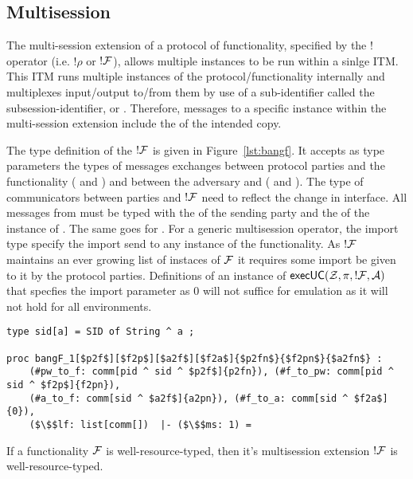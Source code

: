 \subsection{Multisession}
The multi-session extension of a protocol of functionality, specified by the $!$ operator (i.e. $!\rho$ or $!\mathcal{F}$), allows multiple instances to be run within a sinlge ITM.
This ITM runs multiple instances of the protocol/functionality internally and multiplexes input/output to/from them by use of a sub-identifier called the subsession-identifier, or .
Therefore, messages to a specific instance within the multi-session extension include the  of the intended copy. 

The type definition of the $!\mathcal{F}$ is given in Figure~\ref{lst:bangf}. 
It accepts as type parameters the types of messages exchanges between protocol parties and the functionality ( and ) and between the adversary and \F ( and ). 
The type of communicators between parties and $!\mathcal{F}$ need to reflect the change in interface. 
All messages from  must be typed with the  of the sending party and the  of the instance of \F. 
The same goes for \F. 
For a generic multisession operator, the import type specify the import send to any instance of the functionality.
As $!\mathcal{F}$ maintains an ever growing list of instaces of $\mathcal{F}$ it requires some import be given to it by the protocol parties. 
Definitions of an instance of ${\mathsf {execUC}}(\mathcal{Z}, \pi, !\mathcal{F}, \mathcal{A})$ that specfies the import parameter  as 0 will not suffice for emulation as it will not hold for all environments. 

\begin{figure*}
\begin{lstlisting}[basicstyle=\small\BeraMonottFamily, frame=single, mathescape]
type sid[a] = SID of String ^ a ;

proc bangF_1[$p2f$][$f2p$][$a2f$][$f2a$]{$p2fn$}{$f2pn$}{$a2fn$} : 
	(#pw_to_f: comm[pid ^ sid ^ $p2f$]{p2fn}), (#f_to_pw: comm[pid ^ sid ^ $f2p$]{f2pn}),
	(#a_to_f: comm[sid ^ $a2f$]{a2pn}), (#f_to_a: comm[sid ^ $f2a$]{0}),
	($\$$lf: list[comm[])  |- ($\$$ms: 1) =
\end{lstlisting}
\caption{The type definition for the multisession operator for functionalities and the correspond message type and import parameters.}
\label{lst:bangf}
\end{figure*}


\begin{theorem}[PPT !]\label{thm:bangppt}
If a functionality $\mathcal{F}$ is well-resource-typed, then it's multisession extension $!\mathcal{F}$ is well-resource-typed.
\end{theorem}

